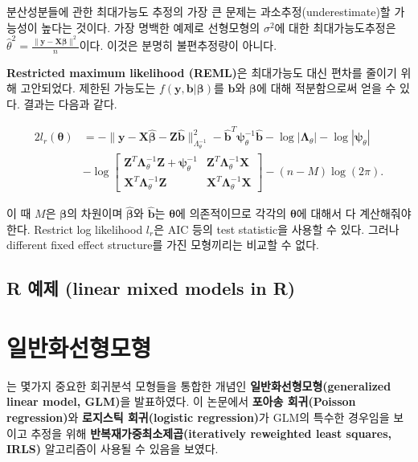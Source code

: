 \documentclass[b5paper,]{scrbook}
\theoremstyle{plain}
\theoremstyle{definition}
\numberwithin{equation}{section}
\begin{document}
분산성분들에 관한 최대가능도 추정의 가장 큰 문제는 과소추정(underestimate)할 가능성이 높다는 것이다. 가장 명백한 예제로 선형모형의 \(\sigma^{2}\)에 대한 최대가능도추정은 \(\hat{\theta}^{2} = \frac{\|\mathbf{y}-\mathbf{X}\boldsymbol{\beta} \|^{2}}{n}\)이다. 이것은 분명히 불편추정량이 아니다.

\textbf{Restricted maximum likelihood (REML)}은 최대가능도 대신 편차를 줄이기 위해 고안되었다. 제한된 가능도는 \(f(\mathbf{y}, \mathbf{b}|\boldsymbol{\beta})\)를 \(\mathbf{b}\)와 \(\boldsymbol{\beta}\)에 대해 적분함으로써 얻을 수 있다. 결과는 다음과 같다.

\begin{align*}
2l_{r}(\boldsymbol{\theta})&=-\|\mathbf{y}-\mathbf{X}\hat{\boldsymbol{\beta}}-\mathbf{Z}\hat{\mathbf{b}} \|_{\Lambda_{\theta}^{-1}}^2-\hat{\mathbf{b}}^{T}\boldsymbol{\psi}_{\theta}^{-1}\hat{\mathbf{b}}-\log|\boldsymbol{\Lambda}_{\theta}|-\log |\boldsymbol{\psi}_{\theta}|\\
&- \log
\begin{bmatrix}
\mathbf{Z}^{T}\boldsymbol{\Lambda}_{\theta}^{-1}\mathbf{Z}+\boldsymbol{\psi}_{\theta}^{-1} & \mathbf{Z}^{T}\boldsymbol{\Lambda}_{\theta}^{-1}\mathbf{X}\\
\mathbf{X}^{T}\boldsymbol{\Lambda}_{\theta}^{-1}\mathbf{Z} & \mathbf{X}^{T}\boldsymbol{\Lambda}_{\theta}^{-1}\mathbf{X}
\end{bmatrix}
-(n-M)\log(2\pi).
\end{align*}

이 때 \(M\)은 \(\boldsymbol{\beta}\)의 차원이며 \(\hat{\boldsymbol{\beta}}\)와 \(\hat{\mathbf{b}}\)는 \(\boldsymbol{\theta}\)에 의존적이므로 각각의 \(\boldsymbol{\theta}\)에 대해서 다 계산해줘야 한다. Restrict log likelihood \(l_{r}\)은 AIC 등의 test statistic을 사용할 수 있다. 그러나 different fixed effect structure를 가진 모형끼리는 비교할 수 없다.

\hypertarget{r--linear-mixed-models-in-r}{%
\section{R 예제 (linear mixed models in R)}\label{r--linear-mixed-models-in-r}}

\hypertarget{glm}{%
\chapter{일반화선형모형}\label{glm}}

\citep{Nelder1972}는 몇가지 중요한 회귀분석 모형들을 통합한 개념인 \textbf{일반화선형모형(generalized linear model, GLM)}을 발표하였다. 이 논문에서 \textbf{포아송 회귀(Poisson regression)}와 \textbf{로지스틱 회귀(logistic regression)}가 GLM의 특수한 경우임을 보이고 추정을 위해 \textbf{반복재가중최소제곱(iteratively reweighted least squares, IRLS)} 알고리즘이 사용될 수 있음을 보였다.
\end{document}

